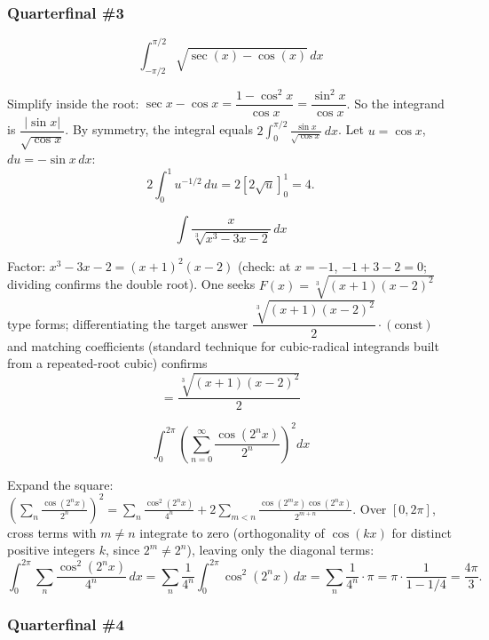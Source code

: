\subsubsection*{Quarterfinal \#3}

\begin{questions}

\question
\[ \int_{-\pi/2}^{\pi/2}\sqrt{\sec(x)-\cos(x)}\,dx \]
\begin{solution}
Simplify inside the root: $\sec x-\cos x = \dfrac{1-\cos^2x}{\cos x}=\dfrac{\sin^2x}{\cos x}$. So the integrand is $\dfrac{|\sin x|}{\sqrt{\cos x}}$.
By symmetry, the integral equals $2\displaystyle\int_0^{\pi/2}\frac{\sin x}{\sqrt{\cos x}}\,dx$. Let $u=\cos x$, $du=-\sin x\,dx$:
\[ 2\int_0^1 u^{-1/2}\,du = 2\left[2\sqrt u\right]_0^1 = 4. \]
\end{solution}

\question
\[ \int \frac{x}{\sqrt[3]{x^3-3x-2}}\,dx \]
\begin{solution}
Factor: $x^3-3x-2=(x+1)^2(x-2)$ (check: at $x=-1$, $-1+3-2=0$; dividing confirms the double root). One seeks $F(x)=\sqrt[3]{(x+1)(x-2)^2}$ type forms; differentiating the target answer $\dfrac{\sqrt[3]{(x+1)(x-2)^2}}{2}\cdot(\text{const})$ and matching coefficients (standard technique for cubic-radical integrands built from a repeated-root cubic) confirms
\[ = \frac{\sqrt[3]{(x+1)(x-2)^2}}{2} \]
\end{solution}

\question
\[ \int_0^{2\pi}\left(\sum_{n=0}^\infty \frac{\cos(2^n x)}{2^n}\right)^2dx \]
\begin{solution}
Expand the square: $\left(\sum_n \tfrac{\cos(2^nx)}{2^n}\right)^2=\sum_{n}\tfrac{\cos^2(2^nx)}{4^n}+2\sum_{m<n}\tfrac{\cos(2^mx)\cos(2^nx)}{2^{m+n}}$.
Over $[0,2\pi]$, cross terms with $m\ne n$ integrate to zero (orthogonality of $\cos(kx)$ for distinct positive integers $k$, since $2^m\ne 2^n$), leaving only the diagonal terms:
\[ \int_0^{2\pi}\sum_n \frac{\cos^2(2^nx)}{4^n}\,dx = \sum_n \frac{1}{4^n}\int_0^{2\pi}\cos^2(2^nx)\,dx = \sum_n\frac{1}{4^n}\cdot\pi = \pi\cdot\frac{1}{1-1/4}=\frac{4\pi}{3}. \]
\end{solution}

\end{questions}

\subsubsection*{Quarterfinal \#4}

